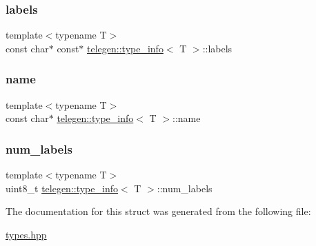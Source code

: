 \subsubsection{\texorpdfstring{labels}{labels}}
{\footnotesize\ttfamily template$<$typename T$>$ \\
const char$\ast$ const$\ast$ \hyperlink{structtelegen_1_1type__info}{telegen\+::type\+\_\+info}$<$ T $>$\+::labels}

\mbox{\label{structtelegen_1_1type__info_ad2de0d0c01346808ffb8f86dfb4a3a0e}} 
\subsubsection{\texorpdfstring{name}{name}}
{\footnotesize\ttfamily template$<$typename T$>$ \\
const char$\ast$ \hyperlink{structtelegen_1_1type__info}{telegen\+::type\+\_\+info}$<$ T $>$\+::name}

\mbox{\label{structtelegen_1_1type__info_aada1921511a38c6889fe0d89701ce125}} 
\subsubsection{\texorpdfstring{num\+\_\+labels}{num\_labels}}
{\footnotesize\ttfamily template$<$typename T$>$ \\
uint8\+\_\+t \hyperlink{structtelegen_1_1type__info}{telegen\+::type\+\_\+info}$<$ T $>$\+::num\+\_\+labels}



The documentation for this struct was generated from the following file\+:\begin{DoxyCompactItemize}
\item 
\hyperlink{types_8hpp}{types.\+hpp}\end{DoxyCompactItemize}
